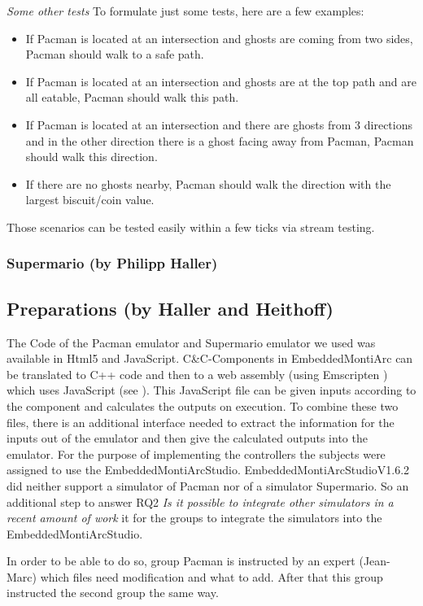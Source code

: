 \emph{Some other tests}\newline
To formulate just some tests, here are a few examples:
\begin{itemize}
	\item If Pacman is located at an intersection and ghosts are coming from two sides, Pacman should walk to a safe path.
	\item If Pacman is located at an intersection and ghosts are at the top path and are all eatable, Pacman should walk this path.
	\item If Pacman is located at an intersection and there are ghosts from 3 directions and in the other direction there is a ghost facing away from Pacman, Pacman should walk this direction.
	\item If there are no ghosts nearby, Pacman should walk the direction with the largest biscuit/coin value.
\end{itemize}

Those scenarios can be tested easily within a few ticks via stream testing.

\subsubsection{Supermario (by Philipp Haller)}


\subsection{Preparations (by Haller and Heithoff)}
The Code of the Pacman emulator \cite{PacmanLink} and Supermario emulator \cite{marioLink} we used was available in Html5 and JavaScript. C\&C-Components in EmbeddedMontiArc can be translated to C++ code and then to a web assembly (using Emscripten \cite{emscirpten}) which uses JavaScript (see \cite{bertram2017component}). This JavaScript file can be given inputs according to the component and calculates the outputs on execution. To combine these two files, there is an additional interface needed to extract the information for the inputs out of the emulator and then give the calculated outputs into the emulator.
For the purpose of implementing the controllers the subjects were assigned to use the EmbeddedMontiArcStudio.
EmbeddedMontiArcStudioV1.6.2 did neither support a simulator of Pacman nor of a simulator Supermario. So an additional step to answer RQ2 \textit{Is it possible to integrate other simulators in a recent amount of work} it for the groups to integrate the simulators into the EmbeddedMontiArcStudio.

In order to be able to do so, group Pacman is instructed by an expert (Jean-Marc) which files need modification and what to add. After that this group instructed the second group the same way.

